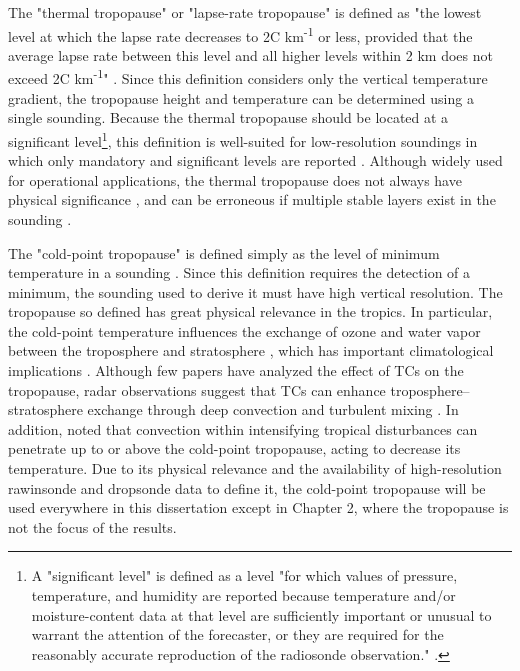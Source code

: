 The "thermal tropopause" or "lapse-rate tropopause" is defined as "the lowest level at which the lapse rate decreases to 2\textdegree{}C km\textsuperscript{-1} or less, provided that the average lapse rate between this level and all higher levels within 2 km does not exceed 2\textdegree{}C km\textsuperscript{-1}" \citep{WMO1957}.
Since this definition considers only the vertical temperature gradient, the tropopause height and temperature can be determined using a single sounding.
Because the thermal tropopause should be located at a significant level\footnote{A "significant level" is defined as a level "for which values of pressure, temperature, and humidity are reported because temperature and/or moisture-content data at that level are sufficiently important or unusual to warrant the attention of the forecaster, or they are required for the reasonably accurate reproduction of the radiosonde observation." \citep{AMSglossary}.}, this definition is well-suited for low-resolution soundings in which only mandatory and significant levels are reported \citep{YuchechenandCanziani}.
Although widely used for operational applications, the thermal tropopause does not always have physical significance \citep{HighwoodHoskins1998}, and can be erroneous if multiple stable layers exist in the sounding \citep{Hoerlingetal1991}.

The "cold-point tropopause" is defined simply as the level of minimum temperature in a sounding \citep{HighwoodHoskins1998}.
Since this definition requires the detection of a minimum, the sounding used to derive it must have high vertical resolution.
The tropopause so defined has great physical relevance in the tropics.
In particular, the cold-point temperature influences the exchange of ozone and water vapor between the troposphere and stratosphere \citep{Moteetal1996}, which has important climatological implications \citep{Holtonetal1995}.
Although few papers have analyzed the effect of TCs on the tropopause, radar observations suggest that TCs can enhance troposphere--stratosphere exchange through deep convection and turbulent mixing \citep{Dasetal2008}.
In addition, \cite{Davisetal2014} noted that convection within intensifying tropical disturbances can penetrate up to or above the cold-point tropopause, acting to decrease its temperature.
Due to its physical relevance and the availability of high-resolution rawinsonde and dropsonde data to define it, the cold-point tropopause will be used everywhere in this dissertation except in Chapter 2, where the tropopause is not the focus of the results.

